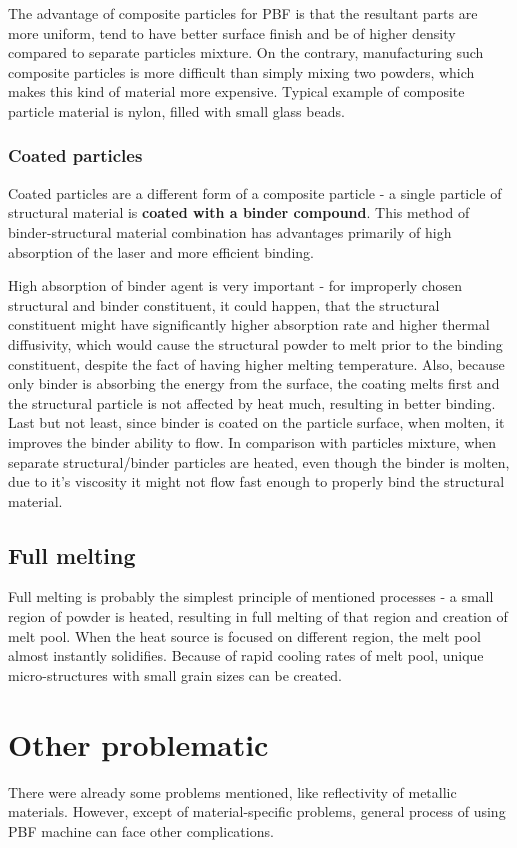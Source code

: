 \documentclass[a4paper, twoside, 11pt]{report}
\begin{document}
	The advantage of composite particles for PBF is that the resultant parts are more uniform, tend to have better surface finish and be of higher density compared to separate particles mixture. On the contrary, manufacturing such composite particles is more difficult than simply mixing two powders, which makes this kind of material more expensive. Typical example of composite particle material is nylon, filled with small glass beads.
\subsubsection{Coated particles}
Coated particles are a different form of a composite particle - a single particle of structural material is \textbf{coated with a binder compound}. This method of binder-structural material combination has advantages primarily of high absorption of the laser and more efficient binding.

	High absorption of binder agent is very important - for improperly chosen structural and binder constituent, it could happen, that the structural constituent might have significantly higher absorption rate and higher thermal diffusivity, which would cause the structural powder to melt prior to the binding constituent, despite the fact of having higher melting temperature. Also, because only binder is absorbing the energy from the surface, the coating melts first and the structural particle is not affected by heat much, resulting in better binding. Last but not least, since binder is coated on the particle surface, when molten, it improves the binder ability to flow. In comparison with particles mixture, when separate structural/binder particles are heated, even though the binder is molten, due to it's viscosity it might not flow fast enough to properly bind the structural material.

\subsection{Full melting}
Full melting is probably the simplest principle of mentioned processes - a small region of powder is heated, resulting in full melting of that region and creation of melt pool. When the heat source is focused on different region, the melt pool almost instantly solidifies. Because of rapid cooling rates of melt pool, unique micro-structures with small grain sizes can be created.

\section{Other problematic}
There were already some problems mentioned, like reflectivity of metallic materials. However, except of material-specific problems, general process of using PBF machine can face other complications.
\end{document}
